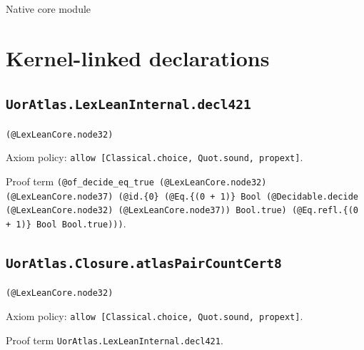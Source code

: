 \documentclass[11pt]{article}
\begin{document}
\begin{center}{\LARGE Native core module}\end{center}
\section*{Kernel-linked declarations}
\subsection*{\texttt{UorAtlas.LexLeanInternal.decl421}}
\noindent\texttt{(@LexLeanCore.node32)}\par
\noindent Axiom policy: \texttt{allow [Classical.choice, Quot.sound, propext]}.\par
\noindent Proof term \texttt{(@of\_decide\_eq\_true (@LexLeanCore.node32) (@LexLeanCore.node37) (@id.\{0\} (@Eq.\{(0 + 1)\} Bool (@Decidable.decide (@LexLeanCore.node32) (@LexLeanCore.node37)) Bool.true) (@Eq.refl.\{(0 + 1)\} Bool Bool.true)))}.\par
\subsection*{\texttt{UorAtlas.Closure.atlasPairCountCert8}}
\noindent\texttt{(@LexLeanCore.node32)}\par
\noindent Axiom policy: \texttt{allow [Classical.choice, Quot.sound, propext]}.\par
\noindent Proof term \texttt{UorAtlas.LexLeanInternal.decl421}.\par
\end{document}
